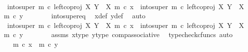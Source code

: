 \begin{isabellebody}
\isanewline
\ \ \ \ \isamarkupfalse%
\ {\isachardoublequoteopen}into{\isacharunderscore}{\kern0pt}super\ m\ {\isasymcirc}\isactrlsub c\ left{\isacharunderscore}{\kern0pt}coproj\ X\ {\isacharparenleft}{\kern0pt}Y\ {\isasymsetminus}\ {\isacharparenleft}{\kern0pt}X{\isacharcomma}{\kern0pt}\ m{\isacharparenright}{\kern0pt}{\isacharparenright}{\kern0pt}\ {\isasymcirc}\isactrlsub c\ x{\isacharprime}{\kern0pt}\ {\isacharequal}{\kern0pt}\ into{\isacharunderscore}{\kern0pt}super\ m\ {\isasymcirc}\isactrlsub c\ left{\isacharunderscore}{\kern0pt}coproj\ X\ {\isacharparenleft}{\kern0pt}Y\ {\isasymsetminus}\ {\isacharparenleft}{\kern0pt}X{\isacharcomma}{\kern0pt}\ m{\isacharparenright}{\kern0pt}{\isacharparenright}{\kern0pt}\ {\isasymcirc}\isactrlsub c\ y{\isacharprime}{\kern0pt}{\isachardoublequoteclose}\isanewline
\ \ \ \ \ \ \isamarkupfalse%
\ into{\isacharunderscore}{\kern0pt}super{\isacharunderscore}{\kern0pt}eq\ \isamarkupfalse%
\ x{\isacharunderscore}{\kern0pt}def\ y{\isacharunderscore}{\kern0pt}def\ \isamarkupfalse%
\ auto\isanewline
\ \ \ \ \isamarkupfalse%
\ \isamarkupfalse%
\ {\isachardoublequoteopen}{\isacharparenleft}{\kern0pt}into{\isacharunderscore}{\kern0pt}super\ m\ {\isasymcirc}\isactrlsub c\ left{\isacharunderscore}{\kern0pt}coproj\ X\ {\isacharparenleft}{\kern0pt}Y\ {\isasymsetminus}\ {\isacharparenleft}{\kern0pt}X{\isacharcomma}{\kern0pt}\ m{\isacharparenright}{\kern0pt}{\isacharparenright}{\kern0pt}{\isacharparenright}{\kern0pt}\ {\isasymcirc}\isactrlsub c\ x{\isacharprime}{\kern0pt}\ {\isacharequal}{\kern0pt}\ {\isacharparenleft}{\kern0pt}into{\isacharunderscore}{\kern0pt}super\ m\ {\isasymcirc}\isactrlsub c\ left{\isacharunderscore}{\kern0pt}coproj\ X\ {\isacharparenleft}{\kern0pt}Y\ {\isasymsetminus}\ {\isacharparenleft}{\kern0pt}X{\isacharcomma}{\kern0pt}\ m{\isacharparenright}{\kern0pt}{\isacharparenright}{\kern0pt}{\isacharparenright}{\kern0pt}\ {\isasymcirc}\isactrlsub c\ y{\isacharprime}{\kern0pt}{\isachardoublequoteclose}\isanewline
\ \ \ \ \ \ \isamarkupfalse%
\ assms\ x{\isacharprime}{\kern0pt}{\isacharunderscore}{\kern0pt}type\ y{\isacharprime}{\kern0pt}{\isacharunderscore}{\kern0pt}type\ comp{\isacharunderscore}{\kern0pt}associative{}\ \isamarkupfalse%
\ {\isacharparenleft}{\kern0pt}typecheck{\isacharunderscore}{\kern0pt}cfuncs{\isacharcomma}{\kern0pt}\ auto{\isacharparenright}{\kern0pt}\isanewline
\ \ \ \ \isamarkupfalse%
\ \isamarkupfalse%
\ {\isachardoublequoteopen}m\ {\isasymcirc}\isactrlsub c\ x{\isacharprime}{\kern0pt}\ {\isacharequal}{\kern0pt}\ m\ {\isasymcirc}\isactrlsub c\ y{\isacharprime}{\kern0pt}{\isachardoublequoteclose}\isanewline

\end{isabellebody}
